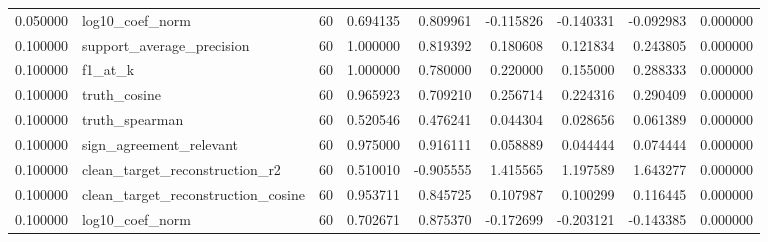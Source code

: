 \begin{table}[t]
\begin{tabular}{rlrrrrrrr}
0.050000 & log10_coef_norm & 60 & 0.694135 & 0.809961 & -0.115826 & -0.140331 & -0.092983 & 0.000000 \\
0.100000 & support_average_precision & 60 & 1.000000 & 0.819392 & 0.180608 & 0.121834 & 0.243805 & 0.000000 \\
0.100000 & f1_at_k & 60 & 1.000000 & 0.780000 & 0.220000 & 0.155000 & 0.288333 & 0.000000 \\
0.100000 & truth_cosine & 60 & 0.965923 & 0.709210 & 0.256714 & 0.224316 & 0.290409 & 0.000000 \\
0.100000 & truth_spearman & 60 & 0.520546 & 0.476241 & 0.044304 & 0.028656 & 0.061389 & 0.000000 \\
0.100000 & sign_agreement_relevant & 60 & 0.975000 & 0.916111 & 0.058889 & 0.044444 & 0.074444 & 0.000000 \\
0.100000 & clean_target_reconstruction_r2 & 60 & 0.510010 & -0.905555 & 1.415565 & 1.197589 & 1.643277 & 0.000000 \\
0.100000 & clean_target_reconstruction_cosine & 60 & 0.953711 & 0.845725 & 0.107987 & 0.100299 & 0.116445 & 0.000000 \\
0.100000 & log10_coef_norm & 60 & 0.702671 & 0.875370 & -0.172699 & -0.203121 & -0.143385 & 0.000000 \\
\bottomrule
\end{tabular}
\end{table}
